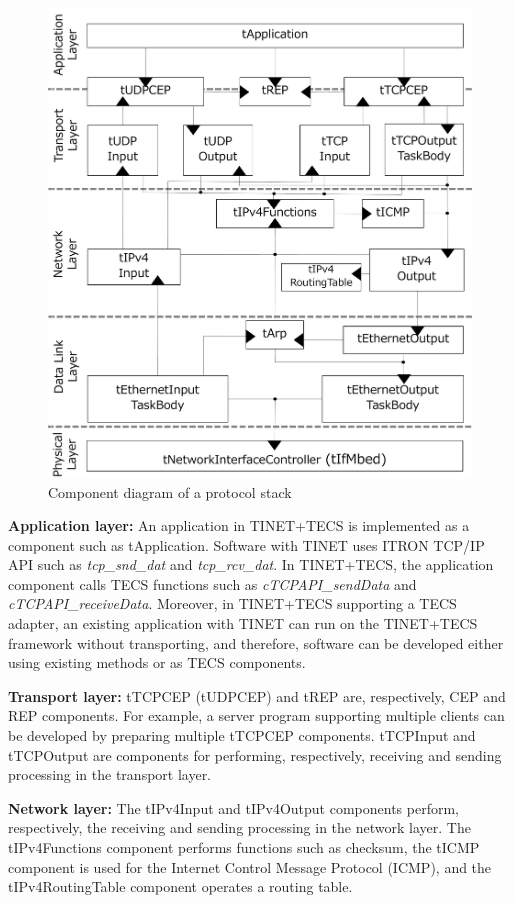 \documentclass[a4j,12pt,oneside,openany,english]{jsbook}
\begin{document}
\begin{figure}[t]
    \centering
    \includegraphics[width=12cm,clip]{figure/ComponentProtocolStack.pdf}
    \caption{Component diagram of a protocol stack}
    \label{fig:ComponentProtocolStack}
\end{figure}


{\bf Application layer:}
An application in TINET+TECS is implemented as a component such as tApplication.
Software with TINET uses ITRON TCP/IP API \cite{url:ITRON_TCP/IP_API_Spec} such as {\it tcp\_snd\_dat} and {\it tcp\_rcv\_dat}.
In TINET+TECS, the application component calls TECS functions such as {\it cTCPAPI\_sendData} and {\it cTCPAPI\_receiveData}.
Moreover, in TINET+TECS supporting a TECS adapter, an existing application with TINET can run on the TINET+TECS framework without transporting, and therefore, software can be developed either using existing methods or as TECS components.

{\bf Transport layer:}
tTCPCEP (tUDPCEP) and tREP are, respectively, CEP and REP components.
For example, a server program supporting multiple clients can be developed by preparing multiple tTCPCEP components.
tTCPInput and tTCPOutput are components for performing, respectively, receiving and sending processing in the transport layer.

{\bf Network layer:}
The tIPv4Input and tIPv4Output components perform, respectively, the receiving and sending processing in the network layer.
The tIPv4Functions component performs functions such as checksum, the tICMP component is used for the Internet Control Message Protocol (ICMP), and the tIPv4RoutingTable component operates a routing table.
\end{document}
